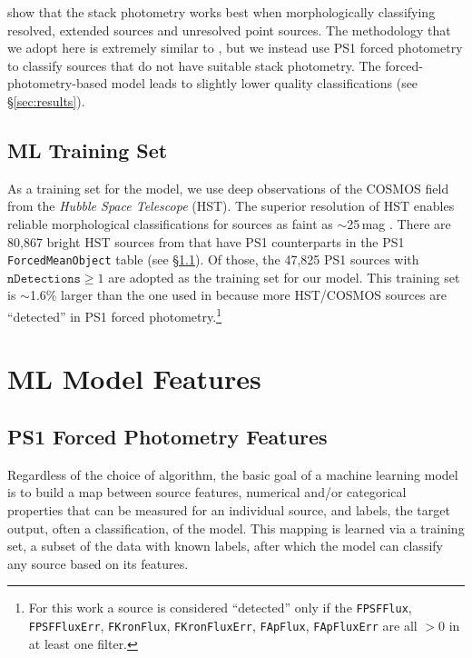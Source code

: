 \documentclass[twocolumn]{aastex63}
\begin{document}
\citet{Tachibana18} show that the stack photometry works best when
morphologically classifying resolved, extended sources and unresolved point
sources. The methodology that we adopt here is extremely similar to
\citet{Tachibana18}, but we instead use PS1 forced photometry to classify
sources that do not have suitable stack photometry. The
forced-photometry-based model leads to slightly lower quality classifications
(see \S\ref{sec:results}).

\subsection{ML Training Set}\label{sec:training_set}

As a training set for the model, we use deep observations of the COSMOS field
from the \textit{Hubble Space Telescope} (HST). The superior
resolution of HST enables reliable morphological classifications for
sources as faint as $\sim$25\,mag \citep{Leauthaud07}. There are 80,867 bright
HST sources from \citet{Leauthaud07} that have PS1 counterparts
\citep[within a 1\arcsec match radius; see][]{Tachibana18} in the PS1
\texttt{ForcedMeanObject} table (see \S\ref{sec:features}). Of those, the
47,825 PS1 sources with $\mathtt{nDetections} \ge 1$ are adopted as the
training set for our model. This training set is $\sim$1.6\%
larger than the one used in \citet{Tachibana18} because more HST/COSMOS sources
are ``detected'' in PS1 forced photometry.\footnote{For this work a source is considered ``detected'' only if the \texttt{FPSFFlux}, \texttt{FPSFFluxErr}, \texttt{FKronFlux}, \texttt{FKronFluxErr}, \texttt{FApFlux}, \texttt{FApFluxErr} are all $> 0$ in at least one filter.}

\section{ML Model Features}\label{sec:ML_features}

\subsection{PS1 Forced Photometry Features}\label{sec:features}

Regardless of the choice of algorithm, the basic goal of a machine learning
model is to build a map between source features, numerical and/or categorical
properties that can be measured for an individual source, and labels, the
target output, often a classification, of the model. This mapping is learned
via a training set, a subset of the data with known labels, after which the
model can classify any source based on its features.
\end{document}
